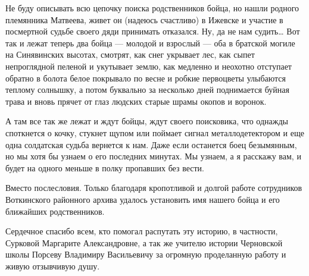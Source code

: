 Не буду описывать всю цепочку поиска родственников бойца, но нашли родного
племянника Матвеева, живет он (надеюсь счастливо) в Ижевске и участие в
посмертной судьбе своего дяди принимать отказался. Ну, да не нам судить… Вот
так и лежат теперь два бойца --- молодой и взрослый --- оба в братской могиле на
Синявинских высотах, смотрят, как снег укрывает лес, как сыпет непроглядной
пеленой и укутывает землю, как медленно и неохотно отступает обратно в болота
белое покрывало по весне и робкие первоцветы улыбаются теплому солнышку, а
потом буквально за несколько дней поднимается буйная трава и вновь прячет от
глаз людских старые шрамы окопов и воронок.

А там все так же лежат и ждут бойцы, ждут своего поисковика, что однажды
споткнется о кочку, стукнет щупом или поймает сигнал металлодетектором и еще
одна солдатская судьба вернется к нам. Даже если останется боец безымянным, но
мы хотя бы узнаем о его последних минутах. Мы узнаем, а я расскажу вам, и будет
на одного меньше в полку пропавших без вести.

Вместо послесловия. Только благодаря кропотливой и долгой работе сотрудников
Воткинского районного архива удалось установить имя нашего бойца и его
ближайших родственников.

Сердечное спасибо всем, кто помогал распутать эту историю, в частности,
Сурковой Маргарите Александровне, а так же учителю истории Черновской школы
Порсеву Владимиру Васильевичу за огромную проделанную работу и живую отзывчивую
душу.

